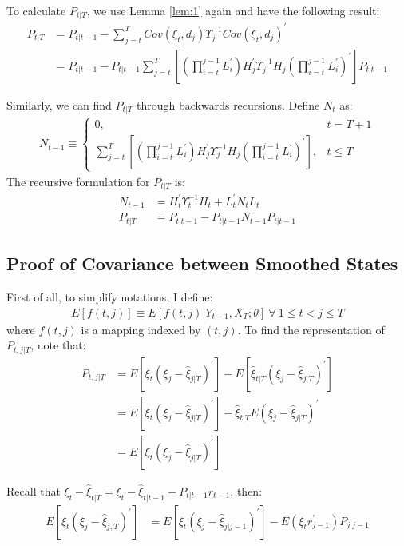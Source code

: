 \documentclass[10pt, titlepage]{article}
\numberwithin{equation}{section}
\begin{document}
To calculate $P_{t|T}$, we use Lemma \ref{lem:1} again and have the following result:
\begin{align*}
    P_{t|T} &= P_{t|t-1} - \sum_{j=t}^TCov(\xi_t,d_j)\Upsilon_j^{-1}Cov(\xi_t,d_j)^{'} \\
    &=P_{t|t-1} - P_{t|t-1}\sum_{j=t}^{T}\left[\left(\prod_{i=t}^{j-1}L_{i}^{'}\right)H_j^{'}\Upsilon_j^{-1}H_j\left(\prod_{i=t}^{j-1}L_{i}^{'}\right)^{'}\right]P_{t|t-1}
\end{align*}

Similarly, we can find $P_{t|T}$ through backwards recursions. Define $N_t$ as:
\begin{align*}
    N_{t-1} \equiv \begin{cases}
        0, & t=T+1 \\
        \sum_{j=t}^{T}\left[\left(\prod_{i=t}^{j-1}L_{i}^{'}\right)H_j^{'}\Upsilon_j^{-1}H_j\left(\prod_{i=t}^{j-1}L_{i}^{'}\right)^{'}\right], & t\leq T
    \end{cases}
\end{align*}
The recursive formulation for $P_{t|T}$ is:
\begin{align*}
    N_{t-1} &= H_t^{'}\Upsilon_t^{-1}H_t + L_t^{'}N_tL_t \\
    P_{t|T} &= P_{t|t-1}- P_{t|t-1}N_{t-1}P_{t|t-1} 
\end{align*}

\subsection{Proof of Covariance between Smoothed States} \label{ap:cov_smooth}
First of all, to simplify notations, I define: 
\begin{align*}
    E[f(t,j)]\equiv E[f(t,j)|Y_{t-1},X_T;\theta] \  \forall\  1\leq t < j \leq T
\end{align*}
where $f(t,j)$ is a mapping indexed by $(t,j)$. To find the representation of $P_{t,j|T}$, note that:
\begin{align*}
    P_{t,j|T} &= E[\xi_t(\xi_j-\hat{\xi}_{j|T})^{'}] - E[\hat{\xi}_{t|T}(\xi_j-\hat{\xi}_{j|T})^{'}] \\
     &= E[\xi_t(\xi_j-\hat{\xi}_{j|T})^{'}] - \hat{\xi}_{t|T}E(\xi_j-\hat{\xi}_{j|T})^{'} \\
     &= E[\xi_t(\xi_j-\hat{\xi}_{j|T})^{'}]
\end{align*}

Recall that $\xi_t-\hat{\xi}_{t|T} = \xi_t - \hat{\xi}_{t|t-1} - P_{t|t-1}r_{t-1}$, then:
\begin{align*}
    E[\xi_t(\xi_j-\hat{\xi}_{j,T})^{'}] &= E[\xi_t(\xi_j-\hat{\xi}_{j|j-1})^{'}] - E(\xi_tr_{j-1}^{'})P_{j|j-1}
\end{align*}
\end{document}
